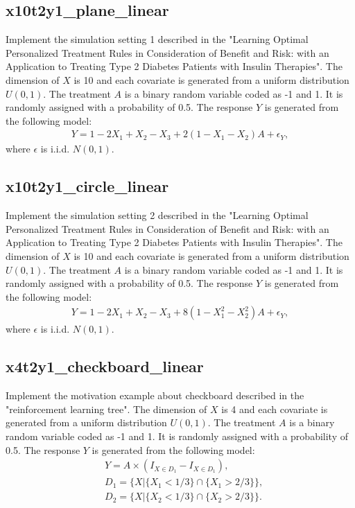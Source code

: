 \documentclass[12pt]{article}
\begin{document}
\subsection*{x10t2y1\_plane\_linear}
Implement the simulation setting 1 described in the "Learning Optimal Personalized Treatment Rules in Consideration of Benefit and Risk: with an Application to Treating Type 2 Diabetes Patients with Insulin Therapies". The dimension of $X$ is 10 and each covariate is generated from a uniform distribution $U(0,1)$. The treatment $A$ is a binary random variable coded as -1 and 1. It is randomly assigned with a probability of 0.5. The response $Y$ is generated from the following model: 
\begin{align*}
Y = 1 -2X_1 + X_2 -X_3 + 2(1-X_1-X_2)A + \epsilon_Y,
\end{align*}
where $\epsilon$ is i.i.d. $N(0,1)$.

\subsection*{x10t2y1\_circle\_linear}
Implement the simulation setting 2 described in the "Learning Optimal Personalized Treatment Rules in Consideration of Benefit and Risk: with an Application to Treating Type 2 Diabetes Patients with Insulin Therapies". The dimension of $X$ is 10 and each covariate is generated from a uniform distribution $U(0,1)$. The treatment $A$ is a binary random variable coded as -1 and 1. It is randomly assigned with a probability of 0.5. The response $Y$ is generated from the following model: 
\begin{align*}
Y = 1 -2X_1 + X_2 -X_3 + 8(1-X_1^2-X_2^2)A + \epsilon_Y,
\end{align*}
where $\epsilon$ is i.i.d. $N(0,1)$.


\subsection*{x4t2y1\_checkboard\_linear}
Implement the motivation example about checkboard described in the "reinforcement learning tree". The dimension of $X$ is 4 and each covariate is generated from a uniform distribution $U(0,1)$. The treatment $A$ is a binary random variable coded as -1 and 1. It is randomly assigned with a probability of 0.5. The response $Y$ is generated from the following model: 
\begin{align*}
&Y = A\times (I_{X\in D_1}-I_{X\in D_1}) , \\
&D_1 = \big\{X|\{X_1<1/3\}\cap\{ X_1>2/3\} \big\}, \\
&D_2 = \big\{X|\{X_2<1/3\} \cap \{X_2>2/3\} \big\}.
\end{align*}
\end{document}
